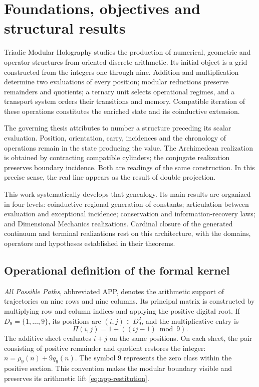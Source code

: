 \chapter*{Foundations, objectives and structural results}
\label{hmt:sistematica:presentacion}

Triadic Modular Holography studies the production of numerical, geometric and operator structures from oriented discrete arithmetic. Its initial object is a grid constructed from the integers one through nine. Addition and multiplication determine two evaluations of every position; modular reductions preserve remainders and quotients; a ternary unit selects operational regimes, and a transport system orders their transitions and memory. Compatible iteration of these operations constitutes the enriched state and its coinductive extension.

The governing thesis attributes to number a structure preceding its scalar evaluation. Position, orientation, carry, incidences and the chronology of operations remain in the state producing the value. The Archimedean realization is obtained by contracting compatible cylinders; the conjugate realization preserves boundary incidence. Both are readings of the same construction. In this precise sense, the real line appears as the result of double projection.

This work systematically develops that genealogy. Its main results are organized in four levels: coinductive regional generation of constants; articulation between evaluation and exceptional incidence; conservation and information-recovery laws; and Dimensional Mechanics realizations. Cardinal closure of the generated continuum and terminal realizations rest on this architecture, with the domains, operators and hypotheses established in their theorems.

\section*{Operational definition of the formal kernel}

\emph{All Possible Paths}, abbreviated APP, denotes the arithmetic support of trajectories on nine rows and nine columns. Its principal matrix is constructed by multiplying row and column indices and applying the positive digital root. If \(D_9=\{1,\ldots,9\}\), its positions are \((i,j)\in D_9^2\), and the multiplicative entry is
\[
 \Pi(i,j)=1+((ij-1)\bmod9).
\]
The additive sheet evaluates \(i+j\) on the same positions. On each sheet, the pair consisting of positive remainder and quotient restores the integer: \(n=\rho_9(n)+9q_9(n)\). The symbol \(9\) represents the zero class within the positive section. This convention makes the modular boundary visible and preserves its arithmetic lift \eqref{eq:app-restitution}.

